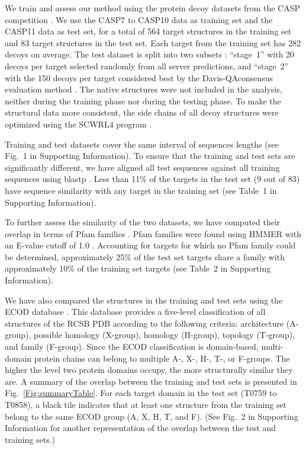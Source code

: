 
We train and assess our method using the protein decoy datasets from
the CASP competition \cite{moult2014critical}.  We use the CASP7 to
CASP10 data as training set and the CASP11 data as test set, for a
total of 564 target structures in the training set and 83 target
structures in the test set. Each target from the training set has 282
decoys on average.
%
The test dataset is split into two subsets \cite{kryshtafovych2015}:
``stage~1'' with 20 decoys per target selected randomly from all
server predictions, and ``stage~2'' with the 150 decoys per target
considered best by the Davis-QAconsensus evaluation
method \cite{kryshtafovych2015}.
%
The native structures were not included in the analysis, neither
during the training phase nor during the testing phase. To make the
structural data more consistent, the side chains of all decoy
structures were optimized using the SCWRL4 program
\cite{krivov2009improved}.

Training and test datasets cover the same interval of sequences
lengths (see Fig.~1 in Supporting Information). To ensure that the
training and test sets are significantly different, we have aligned
all test sequences against all training sequences using
blastp \cite{altschul1990basic}.  Less than 11\% of the targets in the
test set (9 out of 83) have sequence similarity with any target in the
training set (see Table~1 in Supporting Information).

To further assess the similarity of the two datasets, we have computed
their overlap in terms of Pfam families \cite{finn2016pfam}. Pfam
families were found using HMMER \cite{finn2015hmmer} with an E-value
cutoff of 1.0 \cite{finn2016pfam}.  Accounting for targets for which
no Pfam family could be determined, approximately 25\% of the test set
targets share a family with approximately 10\% of the training set
targets (see Table~2 in Supporting Information).

We have also compared the structures in the training and test sets
using the ECOD database \cite{cheng2014ecod}. This database provides a
five-level classification of all structures of the RCSB PDB
\cite{berman2000protein} according to the following criteria:
architecture (A-group), possible homology (X-group), homology
(H-group), topology (T-group), and family (F-group).  Since the ECOD
classification is domain-based, multi-domain protein chains can belong
to multiple A-, X-, H-, T-, or F-groups.  The higher the level two
protein domains occupy, the more structurally similar they are.
%
A summary of the overlap between the training and test sets is
presented in Fig.~\ref{Fig:summaryTable}. For each target domain in
the test set (T0759 to T0858), a black tile indicates that at least
one structure from the training set belong to the same ECOD group (A,
X, H, T, and F). (See Fig.~2 in Supporting Information for another
representation of the overlap between the test and training sets.)

